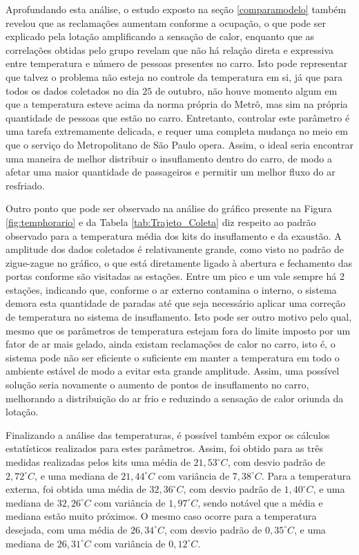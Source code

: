 \documentclass[acronym,symbols,table]{fei}
\begin{document}
Aprofundando esta análise, o estudo exposto na seção \ref{comparamodelo} também revelou que as reclamações aumentam conforme a ocupação, o que pode ser explicado pela lotação amplificando a sensação de calor, enquanto que as correlações obtidas pelo grupo revelam que não há relação direta e expressiva entre temperatura e número de pessoas presentes no carro. Isto pode representar que talvez o problema não esteja no controle da temperatura em si, já que para todos os dados coletados no dia $25$ de outubro, não houve momento algum em que a temperatura esteve acima da norma própria do Metrô, mas sim na própria quantidade de pessoas que estão no carro. Entretanto, controlar este parâmetro é uma tarefa extremamente delicada, e requer uma completa mudança no meio em que o serviço do Metropolitano de São Paulo opera. Assim, o ideal seria encontrar uma maneira de melhor distribuir o insuflamento dentro do carro, de modo a afetar uma maior quantidade de passageiros e permitir um melhor fluxo do ar resfriado.

Outro ponto que pode ser observado na análise do gráfico presente na Figura \ref{fig:temphorario} e da Tabela \ref{tab:Trajeto_Coleta} diz respeito ao padrão observado para a temperatura média dos kits do insuflamento e da exaustão. A amplitude dos dados coletados é relativamente grande, como visto no padrão de zigue-zague no gráfico, o que está diretamente ligado à abertura e fechamento das portas conforme são visitadas as estações. Entre um pico e um vale sempre há $2$ estações, indicando que, conforme o ar externo contamina o interno, o sistema demora esta quantidade de paradas até que seja necessário aplicar uma correção de temperatura no sistema de insuflamento. Isto pode ser outro motivo pelo qual, mesmo que os parâmetros de temperatura estejam fora do limite imposto por um fator de ar mais gelado, ainda existam reclamações de calor no carro, isto é, o sistema pode não ser eficiente o suficiente em manter a temperatura em todo o ambiente estável de modo a evitar esta grande amplitude. Assim, uma possível solução seria novamente o aumento de pontos de insuflamento no carro, melhorando a distribuição do ar frio e reduzindo a sensação de calor oriunda da lotação.

Finalizando a análise das temperaturas, é possível também expor os cálculos estatísticos realizados para estes parâmetros. Assim, foi obtido para as três medidas realizadas pelos kits uma média de $21,53 ^\circ C$, com desvio padrão de $2,72 ^\circ C$, e uma mediana de $21,44 ^\circ C$ com variância de $7,38 ^\circ C$. Para a temperatura externa, foi obtida uma média de $32,36 ^\circ C$, com desvio padrão de $1,40 ^\circ C$, e uma mediana de $32,26 ^\circ C$ com variância de $1,97 ^\circ C$, sendo notável que a média e mediana estão muito próximos. O mesmo caso ocorre para a temperatura desejada, com uma média de $26,34 ^\circ C$, com desvio padrão de $0,35 ^\circ C$, e uma mediana de $26,31 ^\circ C$ com variância de $0,12 ^\circ C$.
\end{document}
